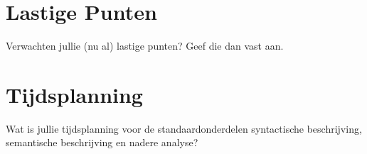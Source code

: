 \documentclass[11pt]{article}
\begin{document}
\section{Lastige Punten}

Verwachten jullie (nu al) lastige punten? Geef die dan vast aan.

\section{Tijdsplanning}

Wat is jullie tijdsplanning voor de standaardonderdelen syntactische beschrijving, semantische beschrijving en nadere analyse?


%
\end{document}

